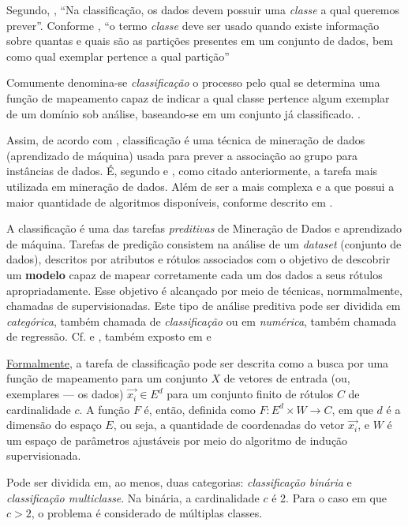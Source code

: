 Segundo, \cite[p. 86]{amaral_introducao_2018}, ``Na classificação, os dados devem possuir uma \textit{classe} a qual queremos prever''. Conforme \cite{Rocha2012}, ``o termo \textit{classe} deve ser usado quando existe informação sobre quantas e quais são as partições presentes em um conjunto de dados, bem como qual exemplar pertence a qual partição''

Comumente denomina-se \textit{classificação} o processo pelo qual se determina uma função de mapeamento capaz de indicar a qual classe pertence algum exemplar de um domínio sob análise, baseando-se em um conjunto já classificado. \cite{Boscarioli2017}.

Assim, de acordo com \cite{classification2013}, classificação é uma técnica de mineração de dados (aprendizado de máquina) usada para prever a associação ao grupo para instâncias de dados. É, segundo \cite{aprenda_mineracao_fernando_amaral16} e \cite{performance_classification2013}, como citado anteriormente, a tarefa mais utilizada em mineração de dados. Além de ser a mais complexa e a que possui a maior quantidade de algoritmos disponíveis, conforme descrito em \cite{classification2013}.

A classificação é uma das tarefas \textit{preditivas} de Mineração de Dados e aprendizado de máquina. Tarefas de predição consistem na análise de um \textit{dataset} (conjunto de dados), descritos por atributos e rótulos associados com o objetivo de descobrir um \textbf{modelo} capaz de mapear corretamente cada um dos dados a seus rótulos apropriadamente. Esse objetivo é alcançado por meio de técnicas, normmalmente, chamadas de supervisionadas. Este tipo de análise preditiva pode ser dividida em \textit{categórica}, também chamada de \textit{classificação} ou em \textit{numérica}, também chamada de regressão. Cf. \cite{Boscarioli2017}  e \cite{classification2013}, também exposto em \cite{ferrari2017} e \cite{goldschmidt2005}

\underline{Formalmente}, a tarefa de classificação pode ser descrita como a busca por uma função de mapeamento para um conjunto $X$ de vetores de entrada (ou, exemplares --- os dados) $\vec{x_i} \in E^d$ para um conjunto finito de rótulos $C$ de cardinalidade $c$. A função $F$ é, então, definida como $F: E^d \times W \rightarrow C$, em que $d$ é a dimensão do espaço $E$, ou seja, a quantidade de coordenadas do vetor $\vec{x_i}$, e $W$ é um espaço de parâmetros ajustáveis por meio do algoritmo de indução supervisionada. \cite{Boscarioli2017}

Pode ser dividida em, ao menos, duas categorias: \textit{classificação binária} e \textit{classificação multiclasse}. Na binária, a cardinalidade $c$ é 2. Para o caso em que $c > 2$, o problema é considerado de múltiplas classes. \cite{Boscarioli2017} \cite{classification2013}

